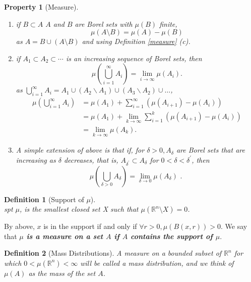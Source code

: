 \documentclass[12pt, a4paper]{article}
\newtheorem{definition}{Definition}[subsection]
\newtheorem{property}{Property}[subsection]
\begin{document}
\begin{property}[Measure]\label{propmeasure} $ $
\begin{enumerate}
    \item if $B\subset A$ $A$ and $B$ are Borel sets with $\mu(B)$ finite, 
    $$\mu(A\setminus B) = \mu(A) - \mu(B)$$ 
    as $A = B\cup(A\setminus B)$ and using Definition \ref{measure} (c).
    \item if $A_{1} \subset A_{2} \subset \cdots$ is an increasing sequence of Borel sets, then
    $$
    \mu\left(\bigcup_{i=1}^{\infty} A_{i}\right)=\lim _{i \rightarrow \infty} \mu\left(A_{i}\right) .
    $$
    as $\displaystyle\bigcup_{i=1}^{\infty} A_{i}=A_{1} \cup\left(A_{2} \backslash A_{1}\right) \cup\left(A_{3} \backslash A_{2}\right) \cup \dots$,
    $$\begin{aligned} \mu\left(\bigcup_{i=1}^{\infty} A_{i}\right) &=\mu\left(A_{1}\right)+\sum_{i=1}^{\infty}\left(\mu\left(A_{i+1}\right)-\mu\left(A_{i}\right)\right) \\ &=\mu\left(A_{1}\right)+\lim _{k \rightarrow \infty} \sum_{i=1}^{k}\left(\mu\left(A_{i+1}\right)-\mu\left(A_{i}\right)\right) \\ &=\lim _{k \rightarrow \infty} \mu\left(A_{k}\right) . \end{aligned}$$
    \item A simple extension of above is that if, for $\delta>0, A_{\delta}$ are Borel sets that are increasing as $\delta$ decreases, that is, $A_{\delta^{\prime}} \subset A_{\delta}$ for $0<\delta<\delta^{\prime}$, then
    $$
    \mu\left(\bigcup_{\delta>0} A_{\delta}\right)=\lim _{\delta \rightarrow 0} \mu\left(A_{\delta}\right) \text { . }
    $$
\end{enumerate}
\end{property}

\begin{definition}[Support of $\mu$] $ $\\
    spt $\mu$, is the smallest closed set X such that $\mu(\mathbb{R}^n\setminus X) = 0$. 
\end{definition}

By above, $x$ is in the support if and only if $\forall r > 0, \mu(B(x, r)) > 0$. We say that \textbf{\textit{$\mu$ is a measure on a set $A$ if $A$ contains the support of $\mu$}}.

\begin{definition}[Mass Distributions]
    A measure on a bounded subset of $\mathbb{R}^{n}$ for which $0<\mu\left(\mathbb{R}^{n}\right)<\infty$ will be called a mass distribution, and we think of $\mu(A)$ as the mass of the set $A$.
\end{definition}
\end{document}
